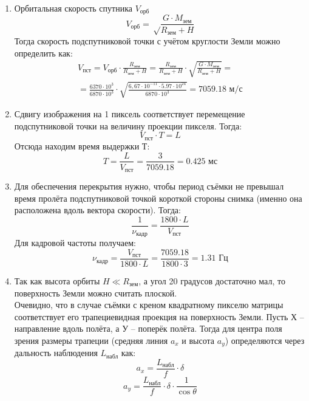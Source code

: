 \solutionSection

\begin{enumerate}
    \item Орбитальная скорость спутника $V_\text{орб}$
    $$V_\text{орб}=\sqrt\frac{G \cdot M_\text{зем}}{R_\text{зем}+H}$$
    Тогда скорость подспутниковой точки с учётом круглости Земли можно определить как:
    \begin{eqnarray}\nonumber
    V_\text{пст}=V_\text{орб}\cdot\frac{R_\text{зем}}{R_\text{зем}+H}=\frac{R_\text{зем}}{R_\text{зем}+H}\cdot\sqrt{\frac{G\cdot M_\text{зем}}{R_\text{зем}+H}}=
    \\\nonumber
    =\frac{6370\cdot 10^3}{6870\cdot 10^3}\cdot\sqrt{\frac{6,67\cdot10^{-11}\cdot 5.97\cdot 10^24}{6870\cdot 10^3}}=7059.18 \text{ м/с}
    \end{eqnarray}
    
    \item Сдвигу изображения на 1 пиксель соответствует перемещение подспутниковой точки на величину проекции пикселя. Тогда:
    $$V_\text{пст}\cdot T=L$$
    Отсюда находим время выдержки Т:
    $$T=\frac{L}{V_\text{пст}} =\frac{3}{7059.18}=0.425\text{ мс}$$
    \item Для обеспечения перекрытия нужно, чтобы период съёмки не превышал время пролёта подспутниковой точкой короткой стороны снимка (именно она расположена вдоль вектора скорости). Тогда:
    $$\frac{1}{\nu_\text{кадр}} =\frac{1800\cdot L}{V_\text{пст}}$$ 
    Для кадровой частоты получаем:
    $$\nu_\text{кадр}=\frac{V_\text{пст}}{1800\cdot L}=\frac{7059.18}{1800\cdot 3}=1.31 \text{ Гц}$$
    
    \item Так как высота орбиты $H\ll R_\text{зем}$, а угол 20 градусов достаточно мал, то поверхность Земли можно считать плоской. \\
    Очевидно, что в случае съёмки с креном квадратному пикселю матрицы соответствует его трапециевидная проекция на поверхность Земли. Пусть Х – направление вдоль полёта, а У – поперёк полёта.  
    Тогда для центра поля зрения размеры трапеции (средняя линия $a_x$ и высота $a_y$) определяются через дальность наблюдения $L_\text{набл}$ как:
    $$a_x=\frac{L_\text{набл}}{f}\cdot\delta$$
    $$a_y=\frac{L_\text{набл}}{f}\cdot\delta\cdot\frac{1}{\cos\theta}$$ 
    

\end{enumerate}

